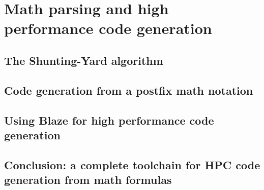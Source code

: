 \documentclass[../main]{subfiles}
\begin{document}
\section{
  Math parsing and high performance code generation
}

\subsection{
  The Shunting-Yard algorithm
}

\subsection{
  Code generation from a postfix math notation
}

\subsection{
  Using Blaze for high performance code generation
}


\subsection{
  Conclusion: a complete toolchain for HPC code generation from math formulas
}
\end{document}
